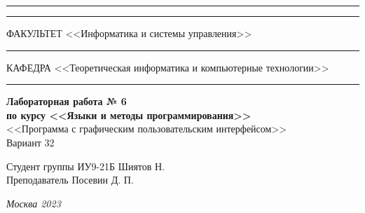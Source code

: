 \documentclass[a4paper, 14pt]{extarticle}
\begin{document}
\begin{titlepage}
\vspace{-25pt}
\hspace{-35pt}\rule{\textwidth}{2.3pt}

\vspace*{-20.3pt}
\hspace{-35pt}\rule{\textwidth}{0.4pt}

\vspace{1.5ex}
\hspace{-35pt} \noindent \small ФАКУЛЬТЕТ\hspace{80pt} <<Информатика и системы управления>>

\vspace*{-16pt}
\hspace{47pt}\rule{0.83\textwidth}{0.4pt}

\vspace{0.5ex}
\hspace{-35pt} \noindent \small КАФЕДРА\hspace{50pt} <<Теоретическая информатика и компьютерные технологии>>

\vspace*{-16pt}
\hspace{30pt}\rule{0.866\textwidth}{0.4pt}
  
\vspace{11em}

\begin{center}
\Large {\bf Лабораторная работа № 6} \\ 
\large {\bf по курсу <<Языки и методы программирования>>} \\
\large <<Программа с графическим пользовательским интерфейсом>> \\
\Large Вариант 32
\end{center}\normalsize

\vspace{8em}


\begin{flushright}
  {Студент группы ИУ9-21Б Шиятов Н. \hspace*{15pt}\\ 
  \vspace{2ex}
  Преподаватель Посевин Д. П.\hspace*{15pt}}
\end{flushright}

\bigskip

\vfill
 

\begin{center}
\textsl{Москва 2023}
\end{center}
\end{titlepage}
\end{document}

